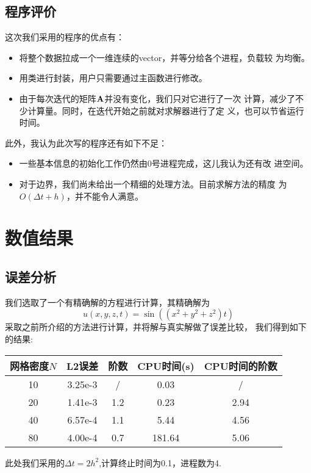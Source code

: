 \documentclass[a4paper,  11pt]{ctexart}
\begin{document}
\subsection{程序评价}
\noindent
这次我们采用的程序的优点有：
\begin{itemize}
	\item 将整个数据拉成一个一维连续的vector，并等分给各个进程，负载较
		为均衡。
	\item 用类进行封装，用户只需要通过主函数进行修改。
    \item 由于每次迭代的矩阵${\bf A}$并没有变化，我们只对它进行了一次
        计算，减少了不少计算量。同时，在迭代开始之前就对求解器进行了定
        义，也可以节省运行时间。
\end{itemize}
此外，我认为此次写的程序还有如下不足：
\begin{itemize}
	\item 一些基本信息的初始化工作仍然由0号进程完成，这儿我认为还有改
		进空间。
	\item 对于边界，我们尚未给出一个精细的处理方法。目前求解方法的精度
        为$O(\Delta t+h)$，并不能令人满意。
\end{itemize}
\section{数值结果}
\subsection{误差分析}
我们选取了一个有精确解的方程进行计算，其精确解为
\begin{equation}
	\label{eq:testfunction}
	u(x,y,z,t)=\sin ((x^2+y^2+z^2)t)
\end{equation}
采取之前所介绍的方法进行计算，并将解与真实解做了误差比较，
我们得到如下的结果:
\begin{table}[H]
	\centering
	\begin{tabular}{ccccc}
		\hline 
		网格密度$N$ & L2误差 & 阶数 & CPU时间(s) & CPU时间的阶数 \\ 
		\hline 
		10  & 3.25e-3 & / & 0.03 & /  \\
		\hline 
		20 & 1.41e-3 & 1.2 & 0.23 & 2.94 \\
		\hline 
		40 & 6.57e-4 & 1.1 & 5.44 & 4.56 \\
		\hline 
		80 & 4.00e-4 & 0.7 & 181.64 & 5.06\\ 
		\hline
	\end{tabular}
\end{table}
此处我们采用的$\Delta t = 2h^2$,计算终止时间为0.1，进程数为4.
\end{document}
